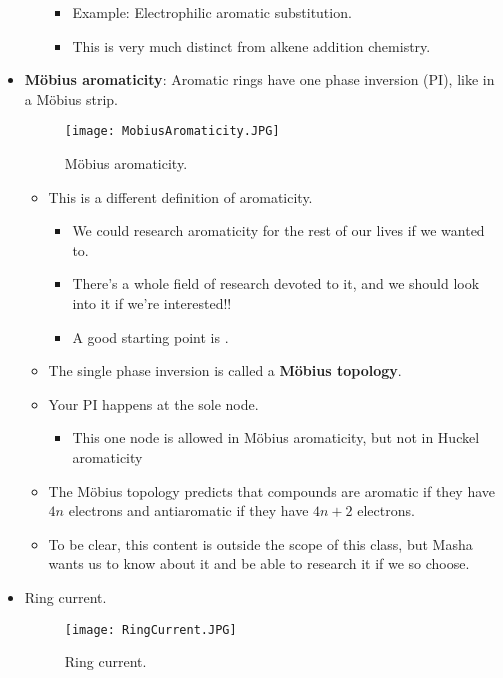 \documentclass[../notes.tex]{subfiles}
\begin{document}
\begin{itemize}
\begin{itemize}
\begin{itemize}
            \item Example: Electrophilic aromatic substitution.
            \item This is very much distinct from alkene addition chemistry.
        \end{itemize}
    \end{itemize}
    \item \textbf{M\"{o}bius aromaticity}: Aromatic rings have one phase inversion (PI), like in a M\"{o}bius strip.
    \begin{figure}[h!]
        \centering
        \texttt{[image: MobiusAromaticity.JPG]}
        \caption{M\"{o}bius aromaticity.}
        \label{fig:MobiusAromaticity}
    \end{figure}
    \begin{itemize}
        \item This is a different definition of aromaticity.
        \begin{itemize}
            \item We could research aromaticity for the rest of our lives if we wanted to.
            \item There's a whole field of research devoted to it, and we should look into it if we're interested!!
            \item A good starting point is \textcite{bib:MobAro}.
        \end{itemize}
        \item The single phase inversion is called a \textbf{M\"{o}bius topology}.
        \item Your PI happens at the sole node.
        \begin{itemize}
            \item This one node is allowed in M\"{o}bius aromaticity, but not in Huckel aromaticity
        \end{itemize}
        \item The M\"{o}bius topology predicts that compounds are aromatic if they have $4n$ electrons and antiaromatic if they have $4n+2$ electrons.
        \item To be clear, this content is outside the scope of this class, but Masha wants us to know about it and be able to research it if we so choose.
    \end{itemize}
    \item Ring current.
    \begin{figure}[h!]
        \centering
        \texttt{[image: RingCurrent.JPG]}
        \caption{Ring current.}

\end{figure}
\end{itemize}
\end{document}
